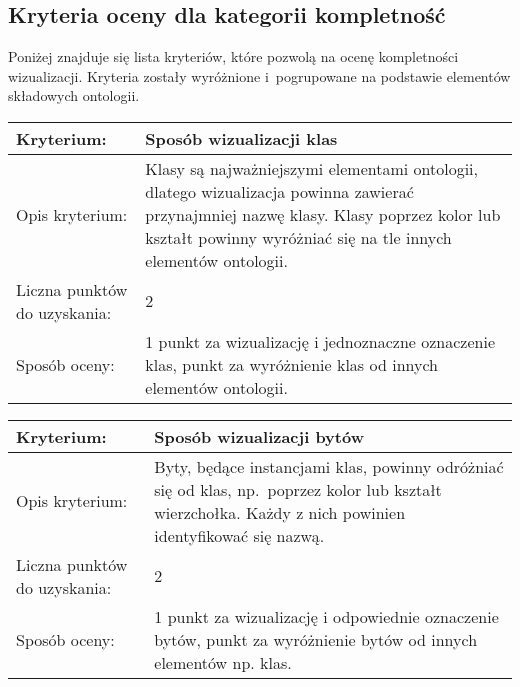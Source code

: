 \subsection*{Kryteria oceny dla kategorii kompletność}

Poniżej znajduje się lista kryteriów, które pozwolą na ocenę kompletności wizualizacji. Kryteria zostały wyróżnione i~pogrupowane na podstawie
elementów składowych ontologii. 

\begin{longtable}{|m{3cm}|m{10cm}|}\hline
Kryterium:                   &  \bf{Sposób wizualizacji klas}\\ \hline
Opis kryterium:              & Klasy są najważniejszymi elementami ontologii, dlatego wizualizacja powinna zawierać przynajmniej nazwę klasy. 
                               Klasy poprzez kolor lub kształt powinny wyróżniać się na tle innych elementów ontologii.\\ \hline
Liczna punktów do uzyskania: & 2 \\ \hline
Sposób oceny:                &  1 punkt za wizualizację i jednoznaczne oznaczenie klas, \newline
                                1 punkt za wyróżnienie klas od innych elementów ontologii.\\ \hline

\end{longtable}



\begin{longtable}{|m{3cm}|m{10cm}|}\hline
Kryterium:                   & \bf{Sposób wizualizacji bytów}\\ \hline
Opis kryterium:              & Byty, będące instancjami klas, powinny odróżniać się od klas, np.~poprzez kolor lub kształt wierzchołka. 
                               Każdy z nich powinien identyfikować się nazwą.  \\ \hline
Liczna punktów do uzyskania: & 2\\ \hline
Sposób oceny:                &  1 punkt za wizualizację i odpowiednie oznaczenie bytów,  \newline
                                1 punkt za wyróżnienie bytów od innych elementów np. klas.\\ \hline

\end{longtable}





